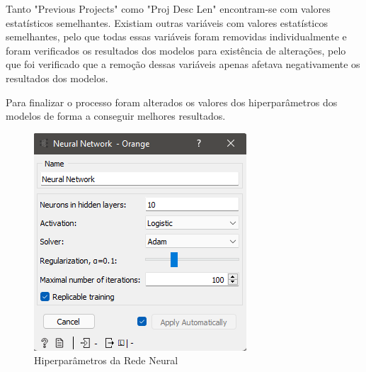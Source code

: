 Tanto "Previous Projects" como "Proj Desc Len" encontram-se com valores estatísticos semelhantes. Existiam outras variáveis com valores estatísticos semelhantes, pelo que todas essas variáveis foram removidas individualmente e foram verificados os resultados dos modelos para existência de alterações, pelo que foi verificado que a remoção dessas variáveis apenas afetava negativamente os resultados dos modelos.

Para finalizar o processo foram alterados os valores dos hiperparâmetros dos modelos de forma a conseguir melhores resultados.

\begin{figure}[H]
    \centering
    \includegraphics[scale=0.5]{images/nnhiper.png}
     \caption{Hiperparâmetros da Rede Neural}
\end{figure}
